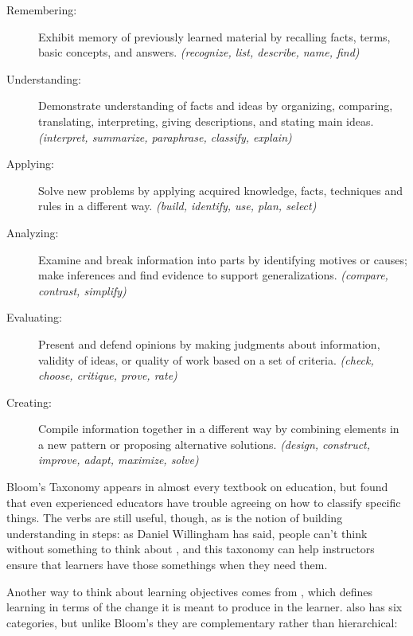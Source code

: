 \begin{description}

\item[Remembering:]
  Exhibit memory of previously learned material by recalling facts, terms, basic concepts, and answers.
  \emph{(recognize, list, describe, name, find)}

\item[Understanding:]
  Demonstrate understanding of facts and ideas
  by organizing, comparing, translating, interpreting, giving descriptions, and stating main ideas.
  \emph{(interpret, summarize, paraphrase, classify, explain)}

\item[Applying:]
  Solve new problems by applying acquired knowledge, facts, techniques and rules in a different way.
  \emph{(build, identify, use, plan, select)}

\item[Analyzing:]
  Examine and break information into parts by identifying motives or causes;
  make inferences and find evidence to support generalizations.
  \emph{(compare, contrast, simplify)}

\item[Evaluating:]
  Present and defend opinions by making judgments about information,
  validity of ideas,
  or quality of work based on a set of criteria.
  \emph{(check, choose, critique, prove, rate)}

\item[Creating:]
  Compile information together in a different way by combining elements in a new pattern or proposing alternative solutions.
  \emph{(design, construct, improve, adapt, maximize, solve)}

\end{description}

Bloom's Taxonomy appears in almost every textbook on education,
but \cite{Masa2018} found that
even experienced educators have trouble agreeing on how to classify specific things.
The verbs are still useful,
though,
as is the notion of building understanding in steps:
as Daniel Willingham has said,
people can't think without something to think about \cite{Will2010},
and this taxonomy can help instructors ensure that learners have those somethings when they need them.

Another way to think about learning objectives comes from \cite{Fink2013},
which defines learning in terms of the change it is meant to produce in the learner.
 also has six categories,
but unlike Bloom's they are complementary rather than hierarchical:

